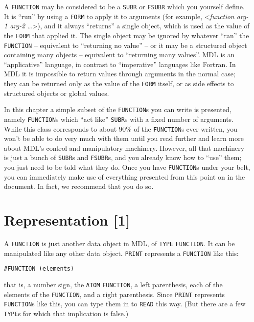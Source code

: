 \documentclass[a4paper]{scrbook}
\begin{document}
A \texttt{FUNCTION} may be considered to be a \texttt{SUBR} or \texttt{FSUBR} which you yourself define. It is ``run'' by
using a \texttt{FORM} to apply it to arguments (for example, \textless{}\emph{function arg-1 arg-2
\ldots{}}\textgreater{}), and it always ``returns'' a single object, which is used as the value of the \texttt{FORM} that
applied it. The single object may be ignored by whatever ``ran'' the \texttt{FUNCTION} -- equivalent to ``returning no
value'' -- or it may be a structured object containing many objects -- equivalent to ``returning many values''. MDL is an
``applicative'' language, in contrast to ``imperative'' languages like Fortran. In MDL it is impossible to return values
through arguments in the normal case; they can be returned only as the value of the \texttt{FORM} itself, or as side
effects to structured objects or global values.

In this chapter a simple subset of the \texttt{FUNCTION}s you can write is presented, namely \texttt{FUNCTION}s which ``act
like'' \texttt{SUBR}s with a fixed number of arguments. While this class corresponds to about 90\% of the
\texttt{FUNCTION}s ever written, you won't be able to do very much with them until you read further and learn more about
MDL's control and manipulatory machinery. However, all that machinery is just a bunch of \texttt{SUBR}s and
\texttt{FSUBR}s, and you already know how to ``use'' them; you just need to be told what they do. Once you have
\texttt{FUNCTION}s under your belt, you can immediately make use of everything presented from this point on in the
document. In fact, we recommend that you do so.

\section{Representation {[}1{]}}\label{representation-1-1}

A \texttt{FUNCTION} is just another data object in MDL, of \texttt{TYPE} \texttt{FUNCTION}. It can be manipulated like any
other data object. \texttt{PRINT} represents a \texttt{FUNCTION} like this:

\begin{verbatim}
#FUNCTION (elements)
\end{verbatim}

that is, a number sign, the \texttt{ATOM} \texttt{FUNCTION}, a left parenthesis, each of the elements of the
\texttt{FUNCTION}, and a right parenthesis. Since \texttt{PRINT} represents \texttt{FUNCTION}s like this, you can type them
in to \texttt{READ} this way. (But there are a few \texttt{TYPE}s for which that implication is false.)
\end{document}
